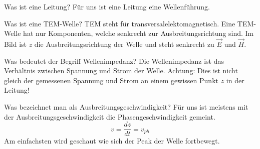 
\begin{karte}{Was ist eine Leitung?}
	Für uns ist eine Leitung eine Wellenführung.\\
\end{karte}

\begin{karte}{Was ist eine TEM-Welle?}
	TEM steht für transversalelektomagnetisch. Eine TEM-Welle hat nur Komponenten, welche senkrecht zur Ausbreitungsrichtung sind. Im Bild ist $z$ die Ausbreitungsrichtung der Welle und steht senkrecht zu $\vec{E}$ und $\vec{H}$. \\[10pt]
	
\end{karte}

\begin{karte}{Was bedeutet der Begriff Wellenimpedanz?}
	Die Wellenimpedanz ist das Verhältnis zwischen Spannung und Strom der Welle. Achtung: Dies ist nicht gleich der gemessenen Spannung und Strom an einem gewissen Punkt $z$ in der Leitung!\\[5pt]
	 
\end{karte}

\begin{karte}{Was bezeichnet man als Ausbreitungsgeschwindigkeit?}
	Für uns ist meistens mit der Ausbreitungsgeschwindigkeit die Phasengeschwindigkeit gemeint.
	\begin{equation*}
		v = \frac{dz}{dt} = v_{ph} 
	\end{equation*}
	Am einfachsten wird geschaut wie sich der Peak der Welle fortbewegt.
	\vspace{-10pt}
	\begin{figure}[h]
		\centering
		
	\end{figure}
\end{karte}

